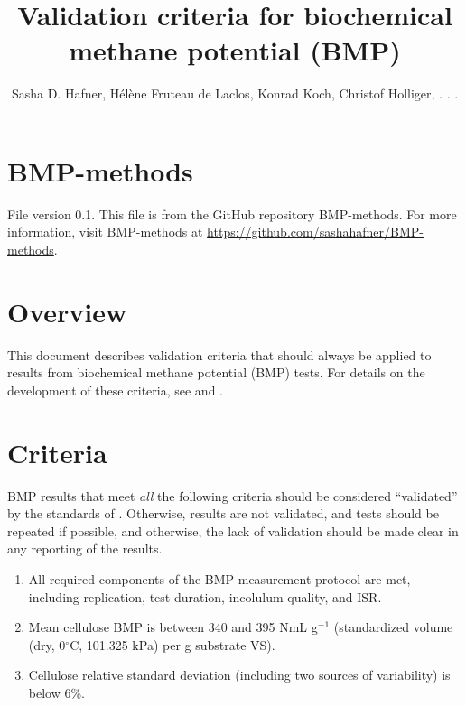 \documentclass[]{article}
\title {Validation criteria for biochemical methane potential (BMP)}
\author{Sasha D. Hafner, H{\'e}l{\`e}ne Fruteau de Laclos, Konrad Koch, Christof Holliger, . . .}
\begin{document}
\maketitle

\section{BMP-methods}
File version 0.1. 
This file is from the GitHub repository BMP-methods.
For more information, visit BMP-methods at \url{https://github.com/sashahafner/BMP-methods}.

\section{Overview}
This document describes validation criteria that should always be applied to results from biochemical methane potential (BMP) tests.
For details on the development of these criteria, see \cite{iis2016} and \cite{iis2020}.

\section{Criteria}
BMP results that meet \textit{all} the following criteria should be considered ``validated'' by the standards of \cite{iis2020}.
Otherwise, results are not validated, and tests should be repeated if possible, and otherwise, the lack of validation should be made clear in any reporting of the results.

\begin{enumerate}
  \item All required components of the BMP measurement protocol \cite{bmpprotocol} are met, including replication, test duration, incolulum quality, and ISR.
  \item Mean cellulose BMP is between 340 and 395 NmL g$^{-1}$ (standardized  volume (dry, 0$^\circ$C, 101.325 kPa) per g substrate VS).
  \item Cellulose relative standard deviation (including two sources of variability) is below 6\%.
\end{enumerate}
\end{document}
